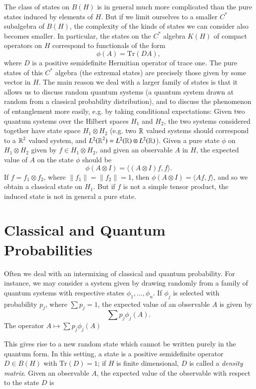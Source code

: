 The class of states on $B(H)$ is in general much more complicated than the pure states induced by elements of $H$. But if we limit ourselves to a smaller $C^*$ subalgebra of $B(H)$, the complexity of the kinds of states we can consider also becomes smaller. In particular, the states on the $C^*$ algebra $K(H)$ of compact operators on $H$ correspond to functionals of the form
%
\[ \phi(A) = \text{Tr}(D A), \]
%
where $D$ is a positive semidefinite Hermitian operator of trace one. The pure states of this $C^*$ algebra (the extremal states) are precisely those given by some vector in $H$. The main reason we deal with a larger family of states is that it allows us to discuss random quantum systems (a quantum system drawn at random from a classical probability distribution), and to discuss the phenomenon of entanglement more easily, e.g. by taking conditional expectations: Given two quantum systems over the Hilbert spaces $H_1$ and $H_2$, the two systems considered together have state space $H_1 \otimes H_2$ (e.g. two $\operatorname{\mathbb{R}}$ valued systems should correspond to a $\operatorname{\mathbb{R}}^2$ valued system, and $L^2(\operatorname{\mathbb{R}}^2) = L^2(\operatorname{\mathbb{R}}) \otimes L^2(\operatorname{\mathbb{R}})$). Given a pure state $\phi$ on $H_1 \otimes H_2$ given by $f \in H_1 \otimes H_2$, and given an observable $A$ in $H$, the expected value of $A$ on the state $\phi$ should be
%
\[ \phi(A \otimes I) = \langle (A \otimes I) f, f \rangle. \]
%
If $f = f_1 \otimes f_2$, where $\| f_1 \| = \| f_2 \| = 1$, then $\phi(A \otimes I) = \langle A f, f \rangle$, and so we obtain a classical state on $H_1$. But if $f$ is not a simple tensor product, the induced state is not in general a pure state.

\section{Classical and Quantum Probabilities}

Often we deal with an intermixing of classical and quantum probability. For instance, we may consider a system given by drawing randomly from a family of quantum systems with respective states $\phi_1,\dots, \phi_n$. If $\phi_j$ is selected with probability $p_j$, where $\sum p_j = 1$, the expected value of an observable $A$ is given by
%
\[ \sum p_j \phi_j(A). \]
%
The operator $A \mapsto \sum p_j \phi_j(A)$


This gives rise to a new random state which cannot be written purely in the quantum form. In this setting, a state is a positive semidefinite operator $D \in B(H)$ with $\text{Tr}(D) = 1$; if $H$ is finite dimensional, $D$ is called a \emph{density matrix}. Given an observable $A$, the expected value of the observable with respect to the state $D$ is

